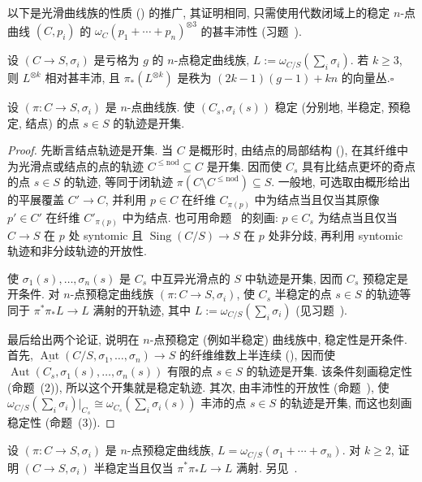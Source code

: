 以下是光滑曲线族的性质 () 的推广, 其证明相同, 只需使用代数闭域上的稳定 $n$-点曲线 $(C,\allowbreak p_i)$ 的 $\omega_C(p_1+\cdots+p_n)^{\otimes3}$ 的甚丰沛性 (习题~).
\begin{proposition}[稳定曲线族的性质]\label{src:6.3.23}
设 $(C\to\allowbreak S,\allowbreak \sigma_i)$ 是亏格为 $g$ 的 $n$-点稳定曲线族, $L:=\omega_{C/S}(\sum_i\sigma_i)$. 若 $k\geq3$, 则 $L^{\otimes k}$ 相对甚丰沛, 且 $\pi_*(L^{\otimes k})$ 是秩为 $(2k-1)(g-1)+kn$ 的向量丛.\hfill$\square$
\end{proposition}
\begin{proposition}[稳定性的开放性]\label{src:6.3.24}
设 $(\pi:C\to\allowbreak S,\allowbreak \sigma_i)$ 是 $n$-点曲线族. 使 $(C_s,\allowbreak \sigma_i(s))$ 稳定 (分别地, 半稳定, 预稳定, 结点) 的点 $s\in S$ 的轨迹是开集.
\end{proposition}
\begin{proof}
先断言结点轨迹是开集. 当 $C$ 是概形时, 由结点的局部结构 (), 在其纤维中为光滑点或结点的点的轨迹 $C^{\leq\mathrm{nod}}\subseteq C$ 是开集. 因而使 $C_s$ 具有比结点更坏的奇点的点 $s\in S$ 的轨迹, 等同于闭轨迹 $\pi(C\setminus C^{\leq\mathrm{nod}})\subseteq S$. 一般地, 可选取由概形给出的平展覆盖 $C'\to\allowbreak C$, 并利用 $p\in C$ 在纤维 $C_{\pi(p)}$ 中为结点当且仅当其原像 $p'\in C'$ 在纤维 $C'_{\pi(p)}$ 中为结点. 也可用命题~ 的刻画: $p\in C_s$ 为结点当且仅当 $C\to\allowbreak S$ 在 $p$ 处 syntomic 且 $\operatorname{Sing}(C/S)\to\allowbreak S$ 在 $p$ 处非分歧, 再利用 syntomic 轨迹和非分歧轨迹的开放性.

使 $\sigma_1(s),\allowbreak \ldots,\allowbreak \sigma_n(s)$ 是 $C_s$ 中互异光滑点的 $S$ 中轨迹是开集, 因而 $C_s$ 预稳定是开条件. 对 $n$-点预稳定曲线族 $(\pi:C\to\allowbreak S,\allowbreak \sigma_i)$, 使 $C_s$ 半稳定的点 $s\in S$ 的轨迹等同于 $\pi^*\pi_*L\to\allowbreak L$ 满射的开轨迹, 其中 $L:=\omega_{C/S}(\sum_i\sigma_i)$ (见习题~).

最后给出两个论证, 说明在 $n$-点预稳定 (例如半稳定) 曲线族中, 稳定性是开条件. 首先, $\underline{\operatorname{Aut}}(C/S,\allowbreak \sigma_1,\allowbreak \ldots,\allowbreak \sigma_n)\to\allowbreak S$ 的纤维维数上半连续 (), 因而使 $\operatorname{Aut}(C_s,\allowbreak \sigma_1(s),\allowbreak \ldots,\allowbreak \sigma_n(s))$ 有限的点 $s\in S$ 的轨迹是开集. 该条件刻画稳定性 (命题~(2)), 所以这个开集就是稳定轨迹. 其次, 由丰沛性的开放性 (命题~), 使 $\omega_{C/S}(\sum_i\sigma_i)|_{C_s}\cong\omega_{C_s}(\sum_i\sigma_i(s))$ 丰沛的点 $s\in S$ 的轨迹是开集, 而这也刻画稳定性 (命题~(3)).
\end{proof}
\begin{exercise}\label{src:6.3.25}
设 $(\pi:C\to\allowbreak S,\allowbreak \sigma_i)$ 是 $n$-点预稳定曲线族, $L=\omega_{C/S}(\sigma_1+\cdots+\sigma_n)$. 对 $k\geq2$, 证明 $(C\to\allowbreak S,\allowbreak \sigma_i)$ 半稳定当且仅当 $\pi^*\pi_*L\to\allowbreak L$ 满射. 另见~\cite[Tag 0E6Y]{SP}.
\end{exercise}

